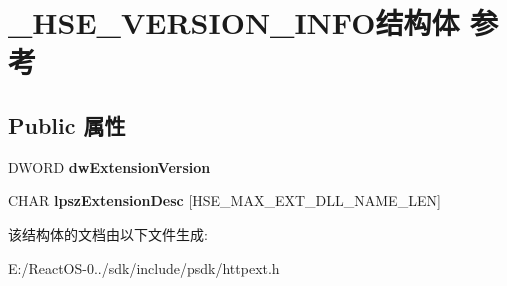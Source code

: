 \hypertarget{struct___h_s_e___v_e_r_s_i_o_n___i_n_f_o}{}\section{\+\_\+\+H\+S\+E\+\_\+\+V\+E\+R\+S\+I\+O\+N\+\_\+\+I\+N\+F\+O结构体 参考}
\label{struct___h_s_e___v_e_r_s_i_o_n___i_n_f_o}
\subsection*{Public 属性}
\begin{DoxyCompactItemize}
\item 
\mbox{\label{struct___h_s_e___v_e_r_s_i_o_n___i_n_f_o_aa1781b31aca3d90e03acfeb8b6519ebf}} 
D\+W\+O\+RD {\bfseries dw\+Extension\+Version}
\item 
\mbox{\label{struct___h_s_e___v_e_r_s_i_o_n___i_n_f_o_ac6f7fa730585df4e3a46457e34b970bb}} 
C\+H\+AR {\bfseries lpsz\+Extension\+Desc} \mbox{[}H\+S\+E\+\_\+\+M\+A\+X\+\_\+\+E\+X\+T\+\_\+\+D\+L\+L\+\_\+\+N\+A\+M\+E\+\_\+\+L\+EN\mbox{]}
\end{DoxyCompactItemize}


该结构体的文档由以下文件生成\+:\begin{DoxyCompactItemize}
\item 
E\+:/\+React\+O\+S-\/0../sdk/include/psdk/httpext.\+h\end{DoxyCompactItemize}
